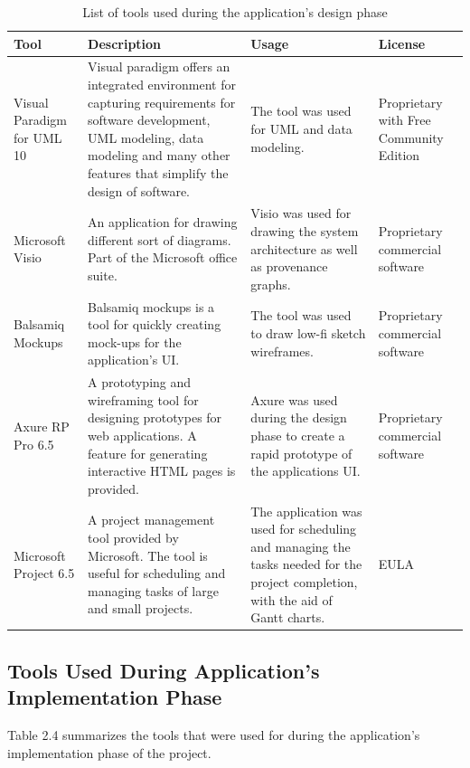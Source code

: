 \begin{table}
  \centering
  \begin{tabular}{|p{100px}|p{100px}|p{100px}|p{100px}|}
    \hline
    Tool  & Description & Usage & License \\
    \hline
    Visual Paradigm for UML 10 & Visual paradigm offers an integrated environment for capturing requirements for software development,  UML modeling, data modeling and many other features that simplify the design of software. & The tool was used for UML and data modeling. & Proprietary with Free Community Edition \\ \hline

    Microsoft Visio & An application for drawing different sort of diagrams. Part of the Microsoft office suite. & Visio was used for drawing the system architecture as well as provenance graphs. & Proprietary commercial software \\ \hline

    Balsamiq Mockups & Balsamiq mockups is a tool for quickly creating mock-ups for the application's UI. & The tool was used to draw low-fi sketch wireframes.  & Proprietary commercial software \\ \hline

    Axure RP Pro 6.5 & A prototyping and wireframing tool for designing prototypes for web applications. A feature for generating interactive HTML pages is provided.  & Axure was used during the design phase to create a rapid prototype of the applications UI. & Proprietary commercial software \\ \hline

    Microsoft Project 6.5 & A project management tool provided by Microsoft. The tool is useful for scheduling and managing tasks of large and small projects.  & The application was used for scheduling and managing the tasks needed for the project completion, with the aid of Gantt charts. & EULA \\ \hline

    \hline
  \end{tabular}
  \caption{List of tools used during the application's design phase}\label{designTools}
\end{table}

\subsection{Tools Used During Application's Implementation Phase}

Table 2.4 summarizes the tools that were used for during the application's implementation phase of the project.

